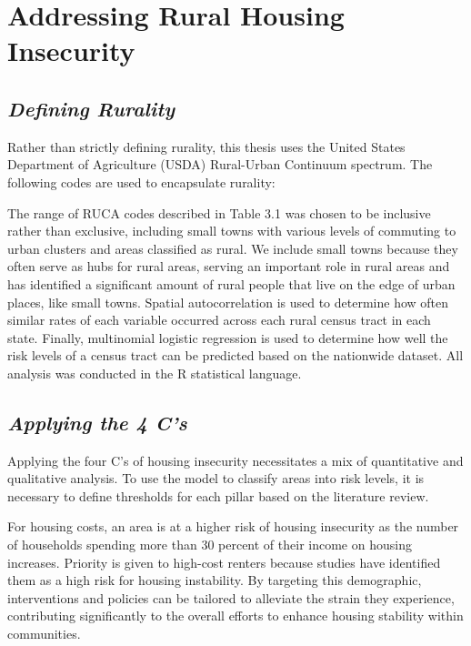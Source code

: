\chapter{Addressing Rural Housing Insecurity}	%

\section{\textit{Defining Rurality}}
Rather than strictly defining rurality, this thesis uses the United States Department of Agriculture (USDA) Rural-Urban Continuum spectrum. The following codes are used to encapsulate rurality:




The range of RUCA codes described in Table 3.1 was chosen to be inclusive rather than exclusive, including small towns with various levels of commuting to urban clusters and areas classified as rural. We include small towns because they often serve as hubs for rural areas, serving an important role in rural areas and \citet{isserman_national_2005} has identified a significant amount of rural people that live on the edge of urban places, like small towns. Spatial autocorrelation is used to determine how often similar rates of each variable occurred across each rural census tract in each state. Finally, multinomial logistic regression is used to determine how well the risk levels of a census tract can be predicted based on the nationwide dataset.  All analysis was conducted in the R statistical language.  

\section{\textit{Applying the 4 C's}}
Applying the four C's of housing insecurity necessitates a mix of quantitative and qualitative analysis. To use the model to classify areas into risk levels, it is necessary to define thresholds for each pillar based on the literature review. 

For housing costs, an area is at a higher risk of housing insecurity as the number of households spending more than 30 percent of their income on housing increases. Priority is given to high-cost renters because studies have identified them as a high risk for housing instability. By targeting this demographic, interventions and policies can be tailored to alleviate the strain they experience, contributing significantly to the overall efforts to enhance housing stability within communities.

